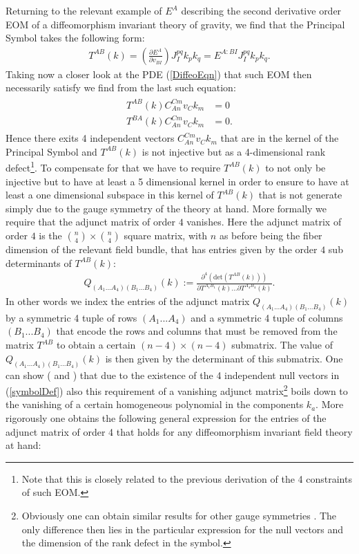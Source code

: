 \documentclass[a4paper,12pt, DIV=14, BCOR=5mm, twoside, headsepline, numbers=noenddot]{scrbook}
\begin{document}
Returning to the relevant example of $E^A$ describing the second derivative order EOM of a diffeomorphism invariant theory of gravity, we find that the Principal Symbol takes the following form:
\begin{align}
    T^{A B} (k) = \left (\frac{\partial E^A}{\partial v_{BI}} \right )J_I^{pq} k_p k_q = E^{A: BI} J_I^{pq} k_p k_q.
\end{align}
Taking now a closer look at the PDE (\ref{DiffeoEqn}) that such EOM then necessarily  satisfy we find from the last such equation:
\begin{align}\label{symbolDef}
\begin{aligned}
    T^{A B} (k) C_{An}^{Cm}v_Ck_m &= 0 \\
    T^{B A} (k) C_{An}^{Cm}v_Ck_m &= 0 .
\end{aligned}
\end{align}
Hence there exits 4 independent vectors $C_{An}^{Cm}v_Ck_m$ that are in the kernel of the Principal Symbol and $T^{AB}(k)$ is not injective but as a 4-dimensional rank defect\footnote{Note that this is closely related to the previous derivation of the 4 constraints of such EOM.}. To compensate for that we have to require $T^{AB}(k)$ to not only be injective but to have at least a 5 dimensional kernel in order to ensure to have at least a one dimensional subspace in this kernel of $T^{AB}(k)$ that is not generate simply due to the gauge symmetry of the theory at hand. More formally we require that the adjunct matrix of order $4$ vanishes. Here the adjunct matrix of order $4$ is the $\binom{n}{4} \times \binom{n}{4}$ square matrix, with $n$ as before being the fiber dimension of the relevant field bundle, that has entries given by the order $4$ sub determinants of $T^{AB}(k)$:
\begin{align}\label{MinorDef}
    Q_{(A_1...A_4) (B_1...B_4)}(k) := \frac{\partial^4 (\mathrm{det}(T^{AB}(k)))}{\partial T^{A_1 B_1}(k) ... \partial T^{A_4 B_4}(k)}.
\end{align}
In other words we index the entries of the adjunct matrix $Q_{(A_1...A_4) (B_1...B_4)}(k)$ by a symmetric 4 tuple of rows $(A_1...A_4)$ and a symmetric 4 tuple of columns $(B_1...B_4)$ that encode the rows and columns that must be removed from the matrix $T^{AB}$ to obtain a certain $(n-4) \times (n-4)$ submatrix. The value of $Q_{(A_1...A_4) (B_1...B_4)}(k)$ is then given by the determinant of this submatrix. 
%
%
%
One can show (\cite{2018PhRvD..97h4036D} and \cite{2009JPhA...42U5402I}) that due to the existence of the 4 independent null vectors in (\ref{symbolDef}) also this requirement of a vanishing adjunct matrix\footnote{Obviously one can obtain similar results for other gauge symmetries \cite{2018PhRvD..97h4036D}. The only difference then lies in the particular expression for the null vectors and the dimension of the rank defect in the symbol.} boils down to the vanishing of a certain homogeneous polynomial in the components $k_a$. More rigorously one obtains the following general expression for the entries of the adjunct matrix of order 4 that holds for any diffeomorphism invariant field theory at hand:
\end{document}
